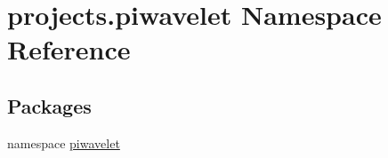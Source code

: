 \hypertarget{namespaceprojects_1_1piwavelet}{\section{projects.\-piwavelet Namespace Reference}
\label{namespaceprojects_1_1piwavelet}
}
\subsection*{Packages}
\begin{DoxyCompactItemize}
\item 
namespace \hyperlink{namespaceprojects_1_1piwavelet_1_1piwavelet}{piwavelet}
\end{DoxyCompactItemize}
